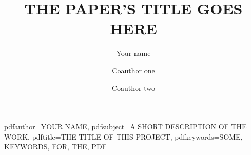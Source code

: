 \hypersetup
{
    pdfauthor={YOUR NAME},
    pdfsubject={A SHORT DESCRIPTION OF THE WORK},
    pdftitle={THE TITLE OF THIS PROJECT},
    pdfkeywords={SOME, KEYWORDS, FOR, THE, PDF}
}





\usepackage{authblk}
\renewcommand\Authfont{\small\scshape}
\renewcommand\Affilfont{\footnotesize\normalfont}
\setlength{\affilsep}{0.2cm}

\title{\large \uppercase{The paper's title goes here}}

\author[1]{Your name}
\author[2]{Coauthor one}
\author[1,3]{Coauthor two}

\date{}
